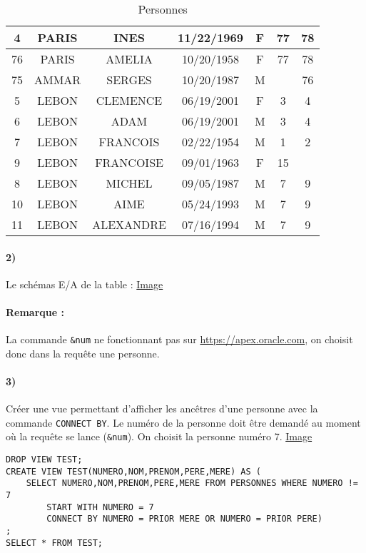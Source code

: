 \documentclass{report}
\begin{document}
\begin{table}[H]
\begin{tabular}{|c|c|c|c|c|c|c|}
		\hline
		4 & PARIS & INES & 11/22/1969 & F & 77 & 78 \\
		\hline
		76 & PARIS & AMELIA & 10/20/1958 & F & 77 & 78 \\
		\hline
		75 & AMMAR & SERGES & 10/20/1987 & M & & 76 \\
		\hline
		5 & LEBON & CLEMENCE & 06/19/2001 & F & 3 & 4 \\
		\hline
		6 & LEBON & ADAM & 06/19/2001 & M & 3 & 4 \\
		\hline
		7 & LEBON & FRANCOIS & 02/22/1954 & M & 1 & 2 \\
		\hline
		9 & LEBON & FRANCOISE & 09/01/1963 & F & 15 &  \\
		\hline
		8 & LEBON & MICHEL & 09/05/1987 & M & 7 & 9 \\
		\hline
		10 & LEBON & AIME & 05/24/1993 & M & 7 & 9 \\
		\hline
		11 & LEBON & ALEXANDRE & 07/16/1994 & M & 7 & 9 \\
		\hline
	\end{tabular}
	\caption{Personnes}
\end{table}

\paragraph{2)}Le schémas E/A de la table : \href{run:./Images/TP7/schemas.png}{Image}

\paragraph{Remarque : }La commande {\tt \&num} ne fonctionnant pas sur \url{https://apex.oracle.com}, on choisit donc dans la requête une personne.

\paragraph{3)}Créer une vue permettant d'afficher les ancêtres d'une personne avec la commande {\tt CONNECT BY}. Le numéro de la personne doit être demandé au moment où la requête se lance ({\tt \&num}). On choisit la personne numéro 7. \href{run:./Images/TP7/tp7_3.png}{Image}

\begin{lstlisting}
DROP VIEW TEST;
CREATE VIEW TEST(NUMERO,NOM,PRENOM,PERE,MERE) AS (
    SELECT NUMERO,NOM,PRENOM,PERE,MERE FROM PERSONNES WHERE NUMERO != 7
        START WITH NUMERO = 7
        CONNECT BY NUMERO = PRIOR MERE OR NUMERO = PRIOR PERE)
;
SELECT * FROM TEST;
\end{lstlisting}
\end{document}

